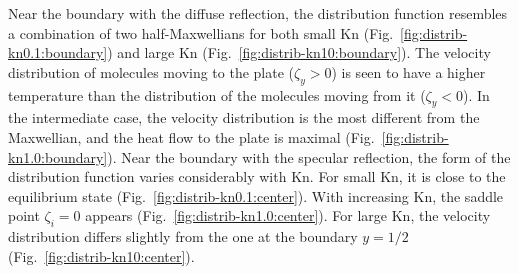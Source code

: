 \documentclass[aip,pof,preprint]{revtex4-1}
\newcommand{\Kn}{\mathrm{Kn}}
\begin{document}
Near the boundary with the diffuse reflection, the distribution function resembles
a combination of two half-Maxwellians for both small \(\Kn\) (Fig.~\ref{fig:distrib-kn0.1:boundary})
and large \(\Kn\) (Fig.~\ref{fig:distrib-kn10:boundary}).
The velocity distribution of molecules moving to the plate (\(\zeta_y>0\)) is seen to
have a higher temperature than the distribution of the molecules moving from it (\(\zeta_y<0\)).
In the intermediate case, the velocity distribution is the most different from the Maxwellian,
and the heat flow to the plate is maximal (Fig.~\ref{fig:distrib-kn1.0:boundary}).
Near the boundary with the specular reflection, the form of the distribution function
varies considerably with \(\Kn\).
For small \(\Kn\), it is close to the equilibrium state (Fig.~\ref{fig:distrib-kn0.1:center}).
With increasing \(\Kn\), the saddle point \(\zeta_i=0\) appears (Fig.~\ref{fig:distrib-kn1.0:center}).
For large \(\Kn\), the velocity distribution differs slightly from the one
at the boundary \(y=1/2\) (Fig.~\ref{fig:distrib-kn10:center}).
\end{document}
